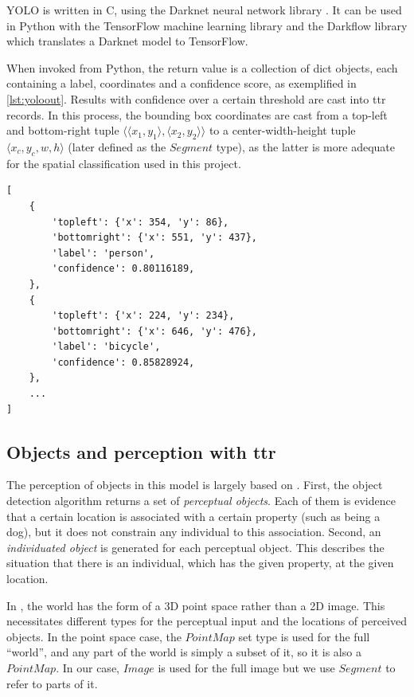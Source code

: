 YOLO is written in C, using the Darknet neural network library \citep{darknet13}.
It can be used in Python with the TensorFlow machine learning library and the Darkflow library which translates a Darknet model to TensorFlow.

When invoked from Python, the return value is a collection of dict objects, each containing a label, coordinates and a confidence score, as exemplified in \autoref{lst:yoloout}.
Results with confidence over a certain threshold are cast into \gls{ttr} records.
In this process, the bounding box coordinates are cast from a top-left and bottom-right tuple $\langle\langle x_1, y_1\rangle, \langle x_2, y_2\rangle\rangle$ to a center-width-height tuple $\langle x_c, y_c, w, h\rangle$ (later defined as the $Segment$ type), as the latter is more adequate for the spatial classification used in this project.

\begin{lstlisting}[label=lst:yoloout, caption=Example output of YOLO invocation]
[
    {
        'topleft': {'x': 354, 'y': 86},
        'bottomright': {'x': 551, 'y': 437},
        'label': 'person',
        'confidence': 0.80116189,
    },
    {
        'topleft': {'x': 224, 'y': 234},
        'bottomright': {'x': 646, 'y': 476},
        'label': 'bicycle',
        'confidence': 0.85828924,
    },
	...
]
\end{lstlisting}



\subsection{Objects and perception with \gls{ttr}}

The perception of objects in this model is largely based on \cite{lspc}.
First, the object detection algorithm returns a set of \textit{perceptual objects}.
Each of them is evidence that a certain location is associated with a certain property (such as being a dog), but it does not constrain any individual to this association.
Second, an \textit{individuated object} is generated for each perceptual object.
This describes the situation that there is an individual, which has the given property, at the given location.

In \cite{lspc}, the world has the form of a 3D point space rather than a 2D image.
This necessitates different types for the perceptual input and the locations of perceived objects.
In the point space case, the $PointMap$ set type is used for the full ``world'', and any part of the world is simply a subset of it, so it is also a $PointMap$.
In our case, $Image$ is used for the full image but we use $Segment$ to refer to parts of it.



